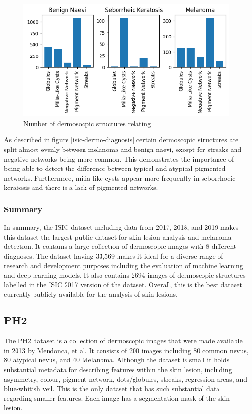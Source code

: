 \begin{figure}
	\centering
	\includegraphics[scale=0.8]{images/ISIC/isic-dermo-diagnosis.png}
	\caption{Number of dermosocpic structures relating} 
\end{figure} \label{isic-dermo-diagnosis}

As described in figure \ref{isic-dermo-diagnosis} certain dermoscopic structures are split almost evenly between melanoma and benign naevi, except for streaks and negative networks being more common. This demonstrates the importance of being able to detect the difference between typical and atypical pigmented networks. Furthermore, milia-like cysts appear more frequently in seborrhoeic keratosis and there is a lack of pigmented networks.

\subsubsection{Summary}
In summary, the ISIC dataset including data from 2017, 2018, and 2019 makes this dataset the largest public dataset for skin lesion analysis and melanoma detection. It contains a large collection of dermoscopic images with 8 different diagnoses. The dataset having 33,569 makes it ideal for a diverse range of research and development purposes including the evaluation of machine learning and deep learning models. It also contains 2694 images of dermoscopic structures labelled in the ISIC 2017 version of the dataset. Overall, this is the best dataset currently publicly available for the analysis of skin lesions.

\subsection{PH2}
The PH2 dataset is a collection of dermoscopic images that were made available in 2013 by Mendonca, et al\cite{}. It consists of 200 images including 80 common nevus, 80 atypical nevus, and 40 Melanoma. Although the dataset is small it holds substantial metadata for describing features within the skin lesion, including asymmetry, colour, pigment network, dots/globules, streaks, regression areas, and blue-whitish veil. This is the only dataset that has such substantial data regarding smaller features. Each image has a segmentation mask of the skin lesion.

